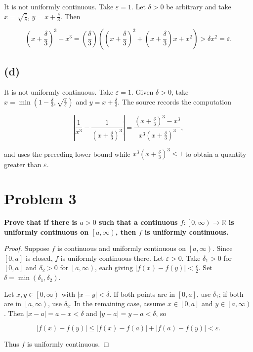 It is not uniformly continuous. Take \(\varepsilon = 1\). Let \(\delta > 0\) be arbitrary and take \(x = \sqrt{\frac{\varepsilon}{\delta}}\), \(y = x + \frac{\delta}{3}\). Then

\[\left( {x + \frac{\delta}{3}} \right)^{3} - x^{3} = \left( \frac{\delta}{3} \right)\left( {\left( {x + \frac{\delta}{3}} \right)^{2} + \left( {x + \frac{\delta}{3}} \right)x + x^{2}} \right) > \delta x^{2} = \varepsilon.\]

\subsection{(d)}

It is not uniformly continuous. Take \(\varepsilon = 1\). Given \(\delta > 0\), take \(x = \min\left( {1 - \frac{\delta}{3},\sqrt{\frac{\varepsilon}{\delta}}} \right)\) and \(y = x + \frac{\delta}{3}\). The source records the computation

\[\left| {\frac{1}{x^{3}} - \frac{1}{\left( {x + \frac{\delta}{3}} \right)^{3}}} \right| = \frac{\left( {x + \frac{\delta}{3}} \right)^{3} - x^{3}}{x^{3}\left( {x + \frac{\delta}{3}} \right)^{3}},\]

and uses the preceding lower bound while \(x^{3}\left( {x + \frac{\delta}{3}} \right)^{3} \leq 1\) to obtain a quantity greater than \(\varepsilon\).

\section{Problem 3}

\textbf{Prove that if there is \(a > 0\) such that a continuous \(f:\left\lbrack {0,\infty} \right)\rightarrow\mathbb{R}\) is uniformly continuous on \(\left\lbrack {a,\infty} \right)\), then \(f\) is uniformly continuous.}

\begin{proof}

Suppose \(f\) is continuous and uniformly continuous on \(\left\lbrack {a,\infty} \right)\). Since \(\left\lbrack {0,a} \right\rbrack\) is closed, \(f\) is uniformly continuous there. Let \(\varepsilon > 0\). Take \(\delta_{1} > 0\) for \(\left\lbrack {0,a} \right\rbrack\) and \(\delta_{2} > 0\) for \(\left\lbrack {a,\infty} \right)\), each giving \(\left| {f(x) - f(y)} \right| < \frac{\varepsilon}{2}\). Set \(\delta = \min\left( {\delta_{1},\delta_{2}} \right)\).

Let \(x,y \in \left\lbrack {0,\infty} \right)\) with \(\left| {x - y} \right| < \delta\). If both points are in \(\left\lbrack {0,a} \right\rbrack\), use \(\delta_{1}\); if both are in \(\left\lbrack {a,\infty} \right)\), use \(\delta_{2}\). In the remaining case, assume \(x \in \left\lbrack {0,a} \right\rbrack\) and \(y \in \left\lbrack {a,\infty} \right)\). Then \(\left| {x - a} \right| = a - x < \delta\) and \(\left| {y - a} \right| = y - a < \delta\), so

\[\left| {f(x) - f(y)} \right| \leq \left| {f(x) - f(a)} \right| + \left| {f(a) - f(y)} \right| < \varepsilon.\]

Thus \(f\) is uniformly continuous.

\end{proof}

